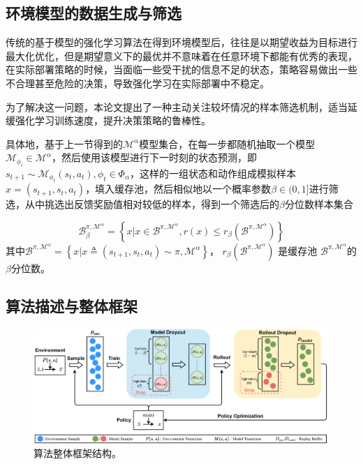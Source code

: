 \subsection{环境模型的数据生成与筛选}\label{sec:rollout-method}

传统的基于模型的强化学习算法在得到环境模型后，往往是以期望收益为目标进行最大化优化，但是期望意义下的最优并不意味着在任意环境下都能有优秀的表现，在实际部署策略的时候，当面临一些受干扰的信息不足的状态，策略容易做出一些不合理甚至危险的决策，导致强化学习在实际部署中不稳定。

为了解决这一问题，本论文提出了一种主动关注较坏情况的样本筛选机制，适当延缓强化学习训练速度，提升决策策略的鲁棒性。

具体地，基于上一节得到的$\mathcal{M}^{\alpha}$模型集合，在每一步都随机抽取一个模型$\mathcal{M}_{\phi_i}\in\mathcal{M}^\alpha$，然后使用该模型进行下一时刻的状态预测，即$s_{t+1}\sim \mathcal{M}_{\phi_t}(s_t,a_t), \phi_t\in\Phi_\alpha$，这样的一组状态和动作组成模拟样本$x=\left(s_{t+1},s_t,a_t\right)$，填入缓存池，然后相似地以一个概率参数$\beta\in(0,1]$进行筛选，从中挑选出反馈奖励值相对较低的样本，得到一个筛选后的$\beta$分位数样本集合

\begin{equation}
    \mathcal{B}_\beta^{\pi,\mathcal{M}^\alpha}=\left\{x|x\in\mathcal{B}^{\pi,\mathcal{M}^\alpha},r(x)\leq r_\beta(\mathcal{B}^{\pi,\mathcal{M}^\alpha})\right\}
\end{equation}
其中$\mathcal{B}^{\pi,\mathcal{M}^\alpha}=\left\{x|x\triangleq\left(s_{t+1},s_t,a_t\right)\sim\pi,\mathcal{M}^\alpha\right\}$， $r_\beta(\mathcal{B}^{\pi,\mathcal{M}^\alpha})$ 是缓存池 $\mathcal{B}^{\pi,\mathcal{M}^\alpha}$的$\beta$分位数。

\subsection{算法描述与整体框架}

\begin{figure}[tbh]
\centering
\includegraphics[width=\textwidth]{figures/mbdp.pdf}
\caption{算法整体框架结构。}
\label{fig:algo-structure}
\end{figure}

